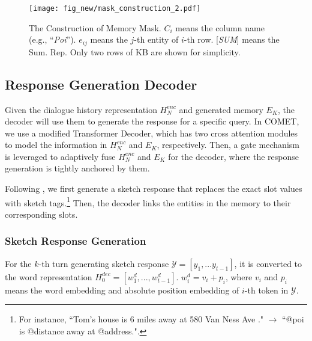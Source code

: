 \documentclass[11pt]{article}
\begin{document}
\begin{figure}[htb]
\begin{center}
\texttt{[image: fig\_new/mask\_construction\_2.pdf]}
\caption{The Construction of Memory Mask. $C_i$ means the column name (e.g., ``\textit{Poi}''). $e_{ij}$ means the $j$-th entity of $i$-th row. {[}\textit{SUM}{]} means the Sum. Rep. Only two rows of KB are shown for simplicity.
}
\label{fig::mask_construct}
\end{center}
\end{figure}




\subsection{Response Generation Decoder}
\label{ssec:decoder}

Given the dialogue history representation $H_N^{enc}$ and generated memory $E_K$, the decoder will use them to generate the response for a specific query. In COMET, we use a modified Transformer Decoder, which has two cross attention modules to model the information in $H_N^{enc}$ and $E_K$, respectively. Then, a gate mechanism is leveraged to adaptively fuse $H_N^{enc}$ and $E_K$ for the decoder, where the response generation is tightly anchored by them.

Following \cite{wu2018globaltolocal,qin-etal-2020-dynamic, yang-etal-2020-graphdialog}, we first generate a sketch response that replaces the exact slot values with sketch tags.\footnote{For instance, ``Tom’s house is 6 miles away at 580 Van Ness Ave ." $\rightarrow$ ``@poi is @distance away at @address.".} Then, the decoder links the entities in the memory to their corresponding slots.

\subsubsection{Sketch Response Generation}
\label{sssec:sketch_reponse}

For the $k$-th turn generating sketch response $\mathcal{Y} = [y_1, ... y_{t-1}]$, it is converted to the word representation $H_0^{dec} = [w_1^d, ..., w_{t-1}^d]$.
$w_i^d = v_i + p_i$, where $v_i$ and $p_i$ means the word embedding and absolute position embedding of $i$-th token in $\mathcal{Y}$.
\end{document}
